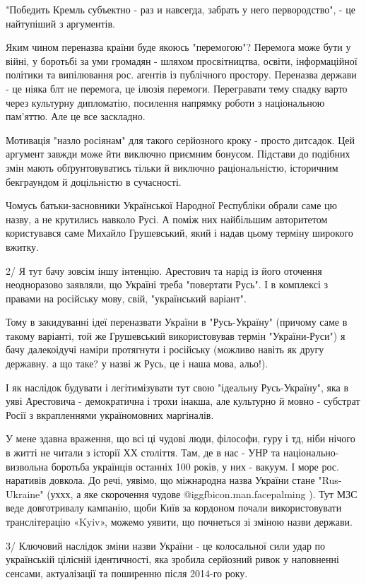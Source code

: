 "Победить Кремль субъектно - раз и навсегда, забрать у него первородство", - це
найтупіший з аргументів. 

Яким чином переназва країни буде якоюсь "перемогою"? Перемога може бути у
війні, у боротьбі за уми громадян - шляхом просвітництва, освіти, інформаційної
політики та випілювання рос. агентів із публічного простору. Переназва держави
- це ніяка блт не перемога, це ілюзія перемоги. Перегравати тему спадку варто
через культурну дипломатію, посилення напрямку роботи з національною пам'яттю.
Але це все заскладно. 

Мотивація "назло росіянам" для такого серйозного кроку - просто дитсадок. Цей
аргумент завжди може йти виключно приємним бонусом. Підстави до подібних змін
мають обґрунтовуватись тільки й виключно раціональністю, історичним бекграундом
й доцільністю в сучасності. 

Чомусь батьки-засновники Української Народної Республіки обрали саме цю назву,
а не крутились навколо Русі. А поміж них найбільшим авторитетом користувався
саме Михайло Грушевський, який і надав цьому терміну широкого вжитку. 

2/ Я тут бачу зовсім іншу інтенцію. Арестович та нарід із його оточення
неодноразово заявляли, що Україні треба "повертати Русь". І в комплексі з
правами на російську мову, свій, "український варіант". 

Тому в закидуванні ідеї переназвати України в "Русь-Україну" (причому саме в
такому варіанті, той же Грушевський використовував термін "України-Руси") я
бачу далекоідучі наміри протягнути і російську (можливо навіть як другу
державну. а що таке? у назві ж Русь, це і наша мова, альо!). 

І як наслідок будувати і легітимізувати тут свою "ідеальну Русь-Україну", яка в
уяві Арестовича - демократична і трохи інакша, але культурно й  мовно -
субстрат Росії з вкрапленнями україномовних маргіналів. 

У мене здавна враження, що всі ці чудові люди, філософи, гуру і тд, ніби нічого
в житті не читали з історії ХХ століття. Там, де в нас - УНР та
національно-визвольна боротьба українців останніх 100 років, у них - вакуум. І
море рос. наративів довкола. До речі, уявімо, що міжнародна назва України стане
"Rus-Ukraine" (уххх, а яке скорочення чудове  @igg{fbicon.man.facepalming} ). Тут МЗС веде довготривалу
кампанію, щоби Київ за кордоном почали використовувати транслітерацію «Kyiv»,
можемо уявити, що почнеться зі зміною назви держави. 

3/ Ключовий наслідок зміни назви України - це колосальної сили удар по
українській цілісній ідентичності, яка зробила серйозний ривок у наповненні
сенсами, актуалізації та поширенню після 2014-го року. 

